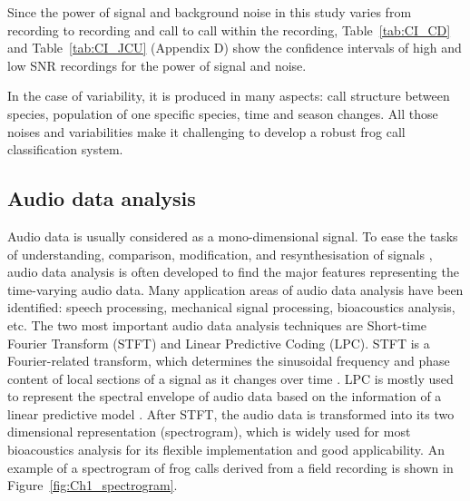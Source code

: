 %



Since the power of signal and background noise in this study varies from recording to recording and call to call within the recording, Table~\ref{tab:CI_CD} and Table~\ref{tab:CI_JCU} (Appendix D) show the confidence intervals of high and low SNR recordings for the power of signal and noise. 

%



In the case of variability, it is produced in many aspects: call structure between species, population of one specific species, time and season changes. All those noises and variabilities make it challenging to develop a robust frog call classification system. 






\subsection{Audio data analysis}
Audio data is usually considered as a mono-dimensional signal. To ease the tasks of understanding, comparison, modification, and resynthesisation of signals \citep{rocchesso2003introduction}, audio data analysis is often developed to find the major features representing the time-varying audio data. Many application areas of audio data analysis have been identified: speech processing, mechanical signal processing, bioacoustics analysis, etc. The two most important audio data analysis techniques are Short-time Fourier Transform (STFT) and Linear Predictive Coding (LPC). STFT is a Fourier-related transform, which determines the sinusoidal frequency and phase content of local sections of a signal as it changes over time \citep{allen1997short}. LPC is mostly used to represent the spectral envelope of audio data based on the information of a linear predictive model \citep{deng2003speech}. After STFT, the audio data is transformed into its two dimensional representation (spectrogram), which is widely used for most bioacoustics analysis for its flexible implementation and good applicability.
An example of a spectrogram of frog calls derived from a field recording is shown in Figure~\ref{fig:Ch1_spectrogram}.

